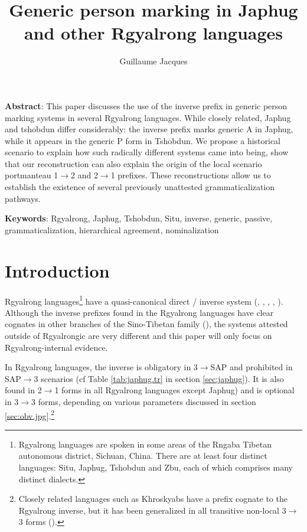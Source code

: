 \documentclass[oldfontcommands,oneside,a4paper,11pt]{article}
\begin{document}
 
\linenumbers
\title{Generic person marking in Japhug and other Rgyalrong languages }
\author{Guillaume Jacques}
\maketitle

\textbf{Abstract}: This paper discusses the use of the inverse prefix in generic person marking systems in several Rgyalrong languages. While closely related,  Japhug and tshobdun differ considerably: the inverse prefix marks generic A in Japhug, while it appears  in the generic P form in Tshobdun. We propose  a historical scenario to explain how such radically different systems came into being, show that our reconstruction can also explain the origin of the local scenario portmanteau  1$\rightarrow$2 and  2$\rightarrow$1 prefixes. These reconstructions allow us to establish the existence of several previously unattested grammaticalization pathways.

\textbf{Keywords}: Rgyalrong, Japhug, Tshobdun, Situ, inverse, generic, passive, grammaticalization, hierarchical agreement, nominalization

 
\section{Introduction}
Rgyalrong languages\footnote{Rgyalrong languages are spoken in some areas of the Rngaba Tibetan autonomous district, Sichuan, China. There are at least four distinct languages: Situ, Japhug, Tshobdun and Zbu, each of which comprises many distinct dialects.} have a quasi-canonical direct / inverse system (\citealt{delancey81direction}, \citealt{jackson02rentongdengdi}, \citealt{jacques10inverse}, \citealt{gongxun14agreement}, \citealt{jacques14inverse}). Although the inverse prefixes found in the Rgyalrong languages have  clear cognates  in other branches of the Sino-Tibetan family (\citealt{delancey10agreement}), the systems attested outside of Rgyalrongic are very different and this paper will only focus on Rgyalrong-internal evidence.

In Rgyalrong languages, the inverse is obligatory in 3$\rightarrow$SAP and prohibited in SAP$\rightarrow$3 scenarios (cf Table \ref{tab:japhug.tr} in section \ref{sec:japhug}). It is also found in  2$\rightarrow$1 forms in all Rgyalrong languages except Japhug) and is optional in 3$\rightarrow$3 forms, depending on various parameters discussed  in section \ref{sec:obv.jpg}.\footnote{Closely related languages such as Khroskyabs have a prefix cognate to the Rgyalrong inverse, but it has been generalized in all transitive non-local 3$\rightarrow$3 forms (\citealt{lai13affixale}).}
\end{document}
